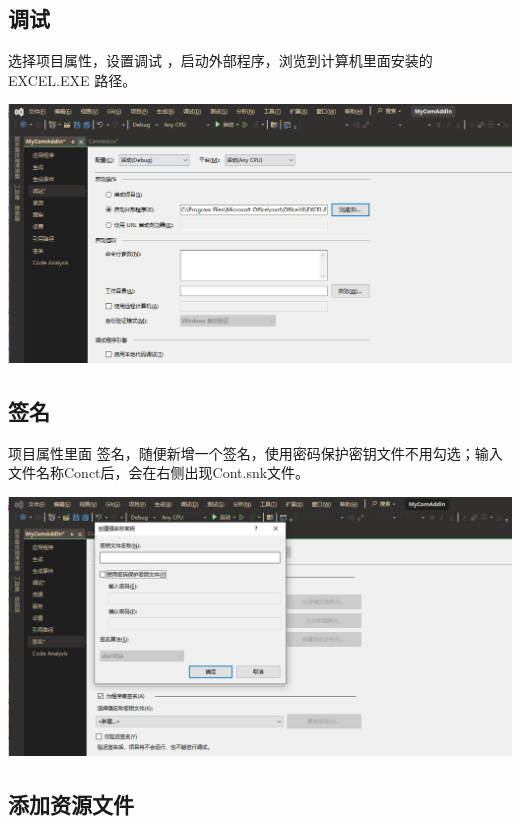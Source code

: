 \documentclass[math,code]{amznotes}
\begin{document}
	\subsection{调试} 选择项目属性，设置调试 ，启动外部程序，浏览到计算机里面安装的EXCEL.EXE 路径。
	
	\includegraphics[width=0.9\linewidth]{pic/debug}
	
	\subsection{签名} 项目属性里面 签名，随便新增一个签名，使用密码保护密钥文件不用勾选；输入文件名称Conct后，会在右侧出现Cont.snk文件。
		
	\includegraphics[width=0.9\linewidth]{pic/sign}
	
	\subsection{添加资源文件}
	
\end{document}

